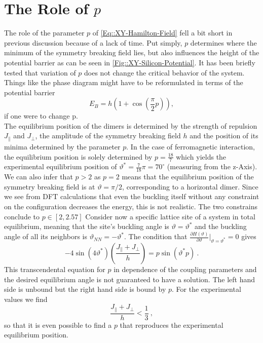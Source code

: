 	\section{The Role of $p$} \label{Section::role-p}
	The role of the parameter $p$ of \eqref{Eq::XY-Hamilton-Field} fell a bit short in previous discussion because of a lack of time. Put simply, $p$ determines where the minimum of the symmetry breaking field lies, but also influences the height of the potential barrier as can be seen in \autoref{Fig::XY-Silicon-Potential}. It has been briefly tested that variation of $p$ does not change the critical behavior of the system. Things like the phase diagram  might have to be reformulated in terms of the potential barrier	
	\begin{equation}
		E_B =	h \left(1 + \cos\left(\frac{\pi}{2} p \right)\right),
	\end{equation}
	if one were to change p. \\
	
	The equilibrium position of the dimers is determined by the strength of repulsion $J_\parallel$ and $J_\perp$, the amplitude of the symmetry breaking field $h$ and the position of its minima determined by the parameter $p$. In the case of ferromagnetic interaction, the equilibrium position is solely determined by $p = \tfrac{18}{7} $ which yields the experimental equilibrium position of $\vartheta^* =	\tfrac{7}{18} \pi = 70^\circ$ (measuring from the z-Axis). We can also infer that $p > 2$ as $p=2$ means that the equilibrium position of the symmetry breaking field is at $\vartheta = \pi /	2$, corresponding to a horizontal dimer. Since we see from DFT calculations that even the buckling itself without any constraint on the configuration decreases the energy, this is not realistic. The two constrains conclude to $p \in \left[2, 2.57\right]$ Consider now a specific lattice site of a system in total equilibrium, meaning that the site's buckling angle is $\vartheta =	\vartheta^*$ and the buckling angle of all its neighbors is $\vartheta_{NN} =	- \vartheta^*$. The condition that $\tfrac{\partial H(\vartheta)}{\partial \vartheta} \Big |_{\vartheta =	\vartheta^*} =	0$ gives
	\begin{equation} \label{Eq::Equilibrium-Position}
		-4 \sin(4 \vartheta^*) \left(\frac{J_\parallel + J_\perp}{h}\right) =	p \sin \left(\vartheta^* p\right)~.
	\end{equation}
	This transcendental equation for $p$ in dependence of the coupling parameters and the desired equilibrium angle is not guaranteed to have a solution. 	The left hand side is unbound but the right hand side is bound by $p$. For the experimental values we find
	\begin{equation}
		\frac{J_\parallel + J_\perp}{h} < \frac{1}{3}~,
	\end{equation}
	so that it is even possible to find a $p$ that reproduces the experimental equilibrium position.

